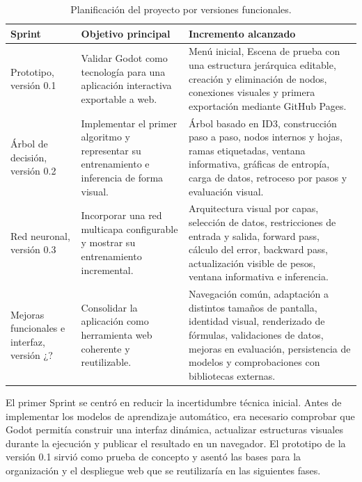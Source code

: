 \begin{table}[H]
  \centering
  \begin{tabular*}{\textwidth}{@{}>{\raggedright\arraybackslash}p{}@{\extracolsep{\fill}}>{\raggedright\arraybackslash}p{}>{\raggedright\arraybackslash}p{}@{}}
    \hline
    \textbf{Sprint} & \textbf{Objetivo principal} & \textbf{Incremento alcanzado} \\
    \hline
    Prototipo, versión 0.1 & Validar Godot como tecnología para una aplicación interactiva exportable a web. & Menú inicial, \gls{Escena} de prueba con una estructura jerárquica editable, creación y eliminación de \gls{nodo}s, conexiones visuales y primera exportación mediante GitHub Pages. \\
    \hline
    Árbol de decisión, versión 0.2 & Implementar el primer algoritmo y representar su entrenamiento e inferencia de forma visual. & Árbol basado en ID3, construcción paso a paso, \gls{nodo}s internos y hojas, ramas etiquetadas, ventana informativa, gráficas de entropía, carga de datos, retroceso por pasos y evaluación visual. \\
    \hline
    Red neuronal, versión 0.3 & Incorporar una red multicapa configurable y mostrar su entrenamiento incremental. & Arquitectura visual por capas, selección de datos, restricciones de entrada y salida, forward pass, cálculo del error, backward pass, actualización visible de pesos, ventana informativa e inferencia. \\
    \hline
    Mejoras funcionales e interfaz, versión ¿? & Consolidar la aplicación como herramienta web coherente y reutilizable. & Navegación común, adaptación a distintos tamaños de pantalla, identidad visual, renderizado de fórmulas, validaciones de datos, mejoras en evaluación, persistencia de modelos y comprobaciones con bibliotecas externas. \\
    \hline
  \end{tabular*}
  \caption{Planificación del proyecto por versiones funcionales.}
  \label{tab:planificacion_versiones}
\end{table}

El primer Sprint se centró en reducir la incertidumbre técnica inicial.
Antes de implementar los modelos de aprendizaje automático, era necesario comprobar que Godot permitía construir una interfaz dinámica, actualizar estructuras visuales durante la ejecución y publicar el resultado en un navegador.
El prototipo de la versión 0.1 sirvió como prueba de concepto y asentó las bases para la organización y el despliegue web que se reutilizaría en las siguientes fases.

